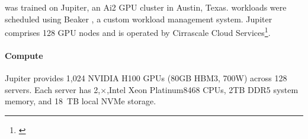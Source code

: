 


\molmoactt was trained on Jupiter, an Ai2 GPU cluster in Austin, Texas. \molmoactt workloads were scheduled using Beaker \citep{guerquin2022beaker}, a custom workload management system. Jupiter comprises 128 GPU nodes and is operated by Cirrascale Cloud Services\footnote{\href{https://www.cirrascale.com/}{}}.

\paragraph{Compute} Jupiter provides 1{,}024 NVIDIA H100 GPUs (80GB HBM3, 700W) across 128 servers. Each server has 2,$\times$,Intel Xeon Platinum8468 CPUs, 2TB DDR5 system memory, and 18~TB local NVMe storage.


